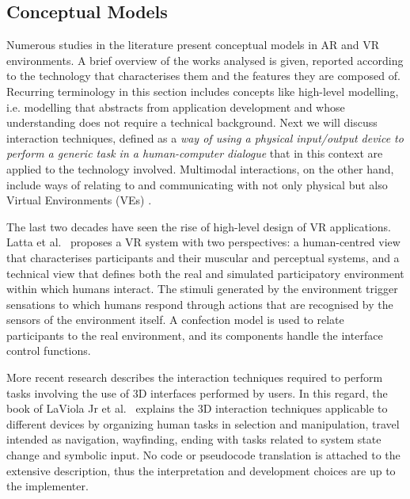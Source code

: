 \subsection{Conceptual Models}

Numerous studies in the literature present conceptual models in AR and VR environments. A brief overview of the works analysed is given, reported according to the technology that characterises them and the features they are composed of.
Recurring terminology in this section includes concepts like high-level modelling, i.e. modelling that abstracts from application development and whose understanding does not require a technical background. Next we will discuss interaction techniques, defined as a \textit{way of using a physical input/output device to perform a generic task in a human-computer dialogue} \cite{foley_computer_1990} that in this context are applied to the technology involved. Multimodal interactions, on the other hand, include ways of relating to and communicating with not only physical but also Virtual Environments (VEs) \cite{bourguet_designing_2003}. 

The last two decades have seen the rise of high-level design of VR applications. Latta et al.~\cite{latta_conceptual_1994} proposes a VR system with two perspectives: a human-centred view that characterises participants and their muscular and perceptual systems, and a technical view that defines both the real and simulated participatory environment within which humans interact. The stimuli generated by the environment trigger sensations to which humans respond through actions that are recognised by the sensors of the environment itself. A confection model is used to relate participants to the real environment, and its components handle the interface control functions. 

More recent research describes the interaction techniques required to perform tasks involving the use of 3D interfaces performed by users. In this regard, the book of LaViola Jr et al.~\cite{laviola_jr_3d_2017} explains the 3D interaction techniques applicable to different devices by organizing human tasks in selection and manipulation, travel intended as navigation, wayfinding, ending with tasks related to system state change and symbolic input. No code or pseudocode translation is attached to the extensive description, thus the interpretation and development choices are up to the implementer. 


